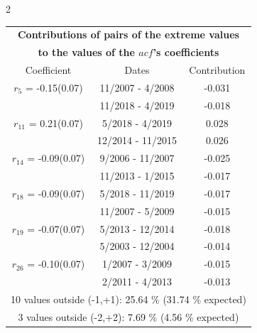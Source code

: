 
\thispagestyle{empty}
\begin{multicols}{2}{ 
\begin{tabular}{ccc}
\multicolumn{3}{c}{\textbf{Contributions of pairs of the extreme values} }  \vspace{-.10in}  \\ 
\multicolumn{3}{c}{ \textbf{to the values of the $acf$'s coefficients}} \\ 
\hline 
\hline                  Coefficient  &  Dates &  Contribution \\ 
\hline 
  $r_{ 5}$ = -0.15(0.07) &      11/2007 -  4/2008 &       -0.031    \vspace{-.10in} \\ 
  &       11/2018 -  4/2019 &       -0.018  \vspace{-.02in}   \\ \hline 
    $r_{11}$ = 0.21(0.07) &       5/2018 -  4/2019 &        0.028   \vspace{-.10in} \\  
&       12/2014 - 11/2015 &        0.026  \vspace{-.02in} \\ \hline 
  $r_{14}$ = -0.09(0.07) &       9/2006 - 11/2007 &       -0.025    \vspace{-.10in} \\ 
  &       11/2013 -  1/2015 &       -0.017  \vspace{-.02in}   \\ \hline 
    $r_{18}$ = -0.09(0.07) &       5/2018 - 11/2019 &       -0.017    \vspace{-.10in} \\ 
  &       11/2007 -  5/2009 &       -0.015  \vspace{-.02in}   \\ \hline 
    $r_{19}$ = -0.07(0.07) &       5/2013 - 12/2014 &       -0.018    \vspace{-.10in} \\ 
  &        5/2003 - 12/2004 &       -0.014  \vspace{-.02in}   \\ \hline 
    $r_{26}$ = -0.10(0.07) &       1/2007 -  3/2009 &       -0.015    \vspace{-.10in} \\ 
  &        2/2011 -  4/2013 &       -0.013  \vspace{-.02in}   \\ \hline 
  \multicolumn{3}{c}{              10 values outside (-1,+1): 25.64  \% (31.74  \% expected)}\vspace{-.10in} \\ 
\multicolumn{3}{c}{               3 values outside (-2,+2):  7.69 \%  (4.56 \% expected) } \\
 \end{tabular} \\ 
 } 
\end{multicols} 
